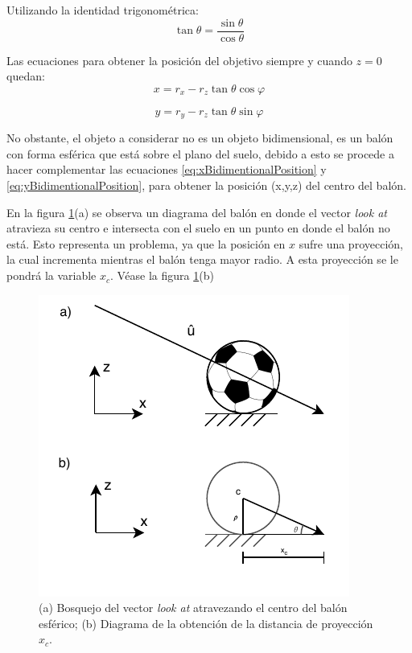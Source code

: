 Utilizando la identidad trigonométrica:
\[\tan{\theta} = \frac{\sin{\theta}}{\cos{\theta}}\]

Las ecuaciones para obtener la posición del objetivo siempre y cuando $z=0$ quedan:
\begin{equation}
\label{eq:xBidimentionalPosition}
x=r_x - r_z \tan{\theta}  \cos{\varphi}
\end{equation}

\begin{equation}
\label{eq:yBidimentionalPosition}
y=r_y - r_z \tan{\theta} \sin{\varphi}
\end{equation}

No obstante, el objeto a considerar no es un objeto bidimensional, es un balón con forma esférica que está sobre el plano del suelo, debido a esto se procede a hacer complementar las ecuaciones \ref{eq:xBidimentionalPosition} y \ref{eq:yBidimentionalPosition}, para obtener la posición (x,y,z) del centro del balón.

En la figura \ref{fig:ballProjection}(a) se observa un diagrama del balón en donde el vector \textit{look at} atravieza su centro e intersecta con el suelo en un punto en donde el balón no está. Esto representa un problema, ya que la posición en $x$ sufre una proyección, la cual incrementa mientras el balón tenga mayor radio. A esta proyección se le pondrá la variable $x_c$. Véase la figura \ref{fig:ballProjection}(b)


\begin{figure}
	\centering
	\includegraphics[scale=1.4]{images/ball_projection.pdf}
	\caption{(a) Bosquejo del vector \textit{look at} atravezando el centro del balón esférico; (b) Diagrama de la obtención de la distancia de proyección $x_c$.}
	\label{fig:ballProjection}
\end{figure}

